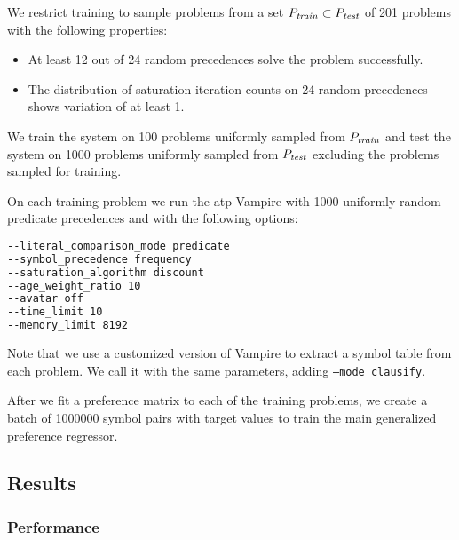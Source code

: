We restrict training to sample problems from a set
\(P_{\mathit{train}} \subset P_{\mathit{test}}\) of 201 problems
with the following properties:

\begin{itemize}
	\item At least 12 out of 24 random precedences solve the problem successfully.
	\item The distribution of saturation iteration counts on 24 random precedences
	shows variation of at least 1.
\end{itemize}

We train the system on 100 problems uniformly sampled from \(P_{\mathit{train}}\)
and test the system on 1000 problems uniformly sampled from \(P_{\mathit{test}}\)
excluding the problems sampled for training.

On each training problem we run the \gls{atp} Vampire with 1000 uniformly random predicate precedences
and with the following options:

\begin{lstlisting}[language=sh]
--literal_comparison_mode predicate
--symbol_precedence frequency
--saturation_algorithm discount
--age_weight_ratio 10
--avatar off
--time_limit 10
--memory_limit 8192
\end{lstlisting}

Note that we use a customized version of Vampire to extract a symbol table from each problem.
We call it with the same parameters, adding \texttt{--mode clausify}.

After we fit a preference matrix to each of the training problems,
we create a batch of 1000000 symbol pairs with target values
to train the main generalized preference regressor.


\subsection{Results}

\subsubsection{Performance}

